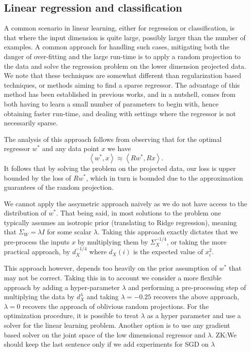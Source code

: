 \documentclass{article}
\theoremstyle{definition}
\theoremstyle{plain}
\newcommand{\ip}[1]{\left \langle #1 \right \rangle}
\newcommand{\zk}[1]{{\color{blue}ZK:#1}}
\begin{document}
\subsection{Linear regression and classification} \label{sec:linear}

A common scenario in linear learning, either for regression or classification, is that where the input dimension is quite large, possibly larger than the number of examples. A common approach for handling such cases, mitigating both the danger of over-fitting and the large run-time is to apply a random projection to the data and solve the regression problem on the lower dimension projected data. We note that these techniques are somewhat different than regularization based techniques, or methods aiming to find a sparse regressor. The advantage of this method has been established in previous works, and in a nutshell, comes from both having to learn a small number of parameters to begin with, hence obtaining faster run-time, and dealing with settings where the regressor is not necessarily sparse.

The analysis of this approach follows from observing that for the optimal regressor $w^*$ and any data point $x$ we have 
$$ \ip{w^*,x} \approx \ip{Rw^*, Rx} .$$
It follows that by solving the problem on the projected data, our loss is upper bounded by the loss of $Rw^*$, which in turn is bounded due to the approximation guarantees of the random projection.

We cannot apply the assymetric approach naively as we do not have access to the distribution of $w^*$. That being said, in most solutions to the problem one typically assumes an isotropic prior (translating to Ridge regression), meaning that $\Sigma_W=\lambda I$ for some scalar $\lambda$. Taking this approach exactly dictates that we pre-process the inputs $x$ by multiplying them by $\Sigma_X^{-1/4}$, or taking the more practical approach, by $d_X^{-1/4}$ where $d_X(i)$ is the expected value of $x_i^2$. 

This approach however, depends too heavily on the prior assumption of $w^*$ that may not be correct. Taking this in to account we consider a more flexible approach by adding a hyper-parameter $\lambda$ and performing a pre-processing step of multiplying the data by $d_X^{\lambda}$ and taking $\lambda=-0.25$ recovers the above approach, $\lambda=0$ recovers the approach of oblivious random projections. For the optimization procedure, it is possible to treat $\lambda$ as a hyper parameter and use a solver for the linear learning problem. Another option is to use any gradient based solver on the joint space of the low dimensional regressor and $\lambda$. \zk{We should keep the last sentence only if we add experiments for SGD on $\lambda$}
\end{document}
